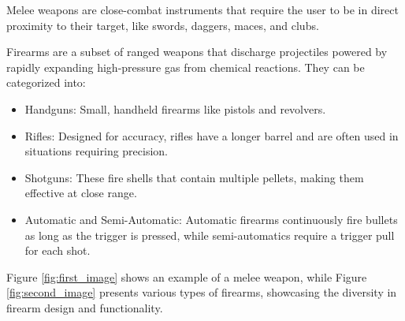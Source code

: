 Melee weapons are close-combat instruments that require the user to be in direct proximity to their target, 
like swords, daggers, maces, and clubs.

Firearms are a subset of ranged weapons that discharge projectiles powered by rapidly expanding high-pressure gas 
from chemical reactions. They can be categorized into:
\begin{itemize}
    \item Handguns: Small, handheld firearms like pistols and revolvers.
    \item Rifles: Designed for accuracy, rifles have a longer barrel and are often used in situations requiring precision.
    \item Shotguns: These fire shells that contain multiple pellets, making them effective at close range.
    \item Automatic and Semi-Automatic: Automatic firearms continuously fire bullets as long as the trigger is pressed, while semi-automatics require a trigger pull for each shot.
\end{itemize}

Figure \ref{fig:first_image} shows an example of a melee weapon, while 
Figure \ref{fig:second_image} presents various types of firearms, showcasing the diversity in firearm design and 
functionality.

